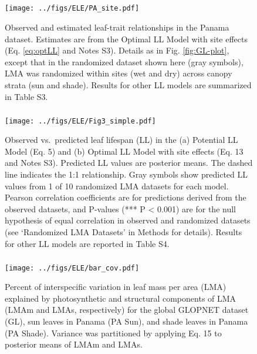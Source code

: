 \documentclass[12pt,]{article}
\let\oldsubparagraph\subparagraph
\renewcommand{\subparagraph}[1]{\oldsubparagraph{#1}\mbox{}}
\theoremstyle{definition}
\theoremstyle{definition}
\theoremstyle{definition}
\theoremstyle{remark}
\begin{document}
\hypertarget{section-2}{%
\subparagraph{}\label{section-2}}

\newpage{}

\begin{figure}
\centering
\texttt{[image: ../figs/ELE/PA\_site.pdf]}
\caption{\label{fig:PA-plot}Observed and estimated leaf-trait relationships
in the Panama dataset. Estimates are from the Optimal LL Model with site
effects (Eq. \eqref{eq:optLL} and Notes S3). Details as in Fig.
\ref{fig:GL-plot}, except that in the randomized dataset shown here
(gray symbols), LMA was randomized within sites (wet and dry) across
canopy strata (sun and shade). Results for other LL models are
summarized in Table S3.}
\end{figure}

\hypertarget{section-3}{%
\subparagraph{}\label{section-3}}

\newpage

\begin{figure}
\centering
\texttt{[image: ../figs/ELE/Fig3\_simple.pdf]}
\caption{\label{fig:LL-pre}Observed vs.~predicted leaf lifespan (LL) in the
(a) Potential LL Model (Eq. 5) and (b) Optimal LL Model with site
effects (Eq. 13 and Notes S3). Predicted LL values are posterior means.
The dashed line indicates the 1:1 relationship. Gray symbols show
predicted LL values from 1 of 10 randomized LMA datasets for each model.
Pearson correlation coefficients are for predictions derived from the
observed datasets, and P-values (*** P \textless{} 0.001) are for the
null hypothesis of equal correlation in observed and randomized datasets
(see `Randomized LMA Datasets' in Methods for details). Results for
other LL models are reported in Table S4.}
\end{figure}

\hypertarget{section-4}{%
\subparagraph{}\label{section-4}}

\newpage

\begin{figure}
\centering
\texttt{[image: ../figs/ELE/bar\_cov.pdf]}
\caption{\label{fig:bar-cov}Percent of interspecific variation in leaf mass
per area (LMA) explained by photosynthetic and structural components of
LMA (LMAm and LMAs, respectively) for the global GLOPNET dataset (GL),
sun leaves in Panama (PA Sun), and shade leaves in Panama (PA Shade).
Variance was partitioned by applying Eq. 15 to posterior means of LMAm
and LMAs.}
\end{figure}

\hypertarget{section-5}{%
\subparagraph{}\label{section-5}}
\end{document}
